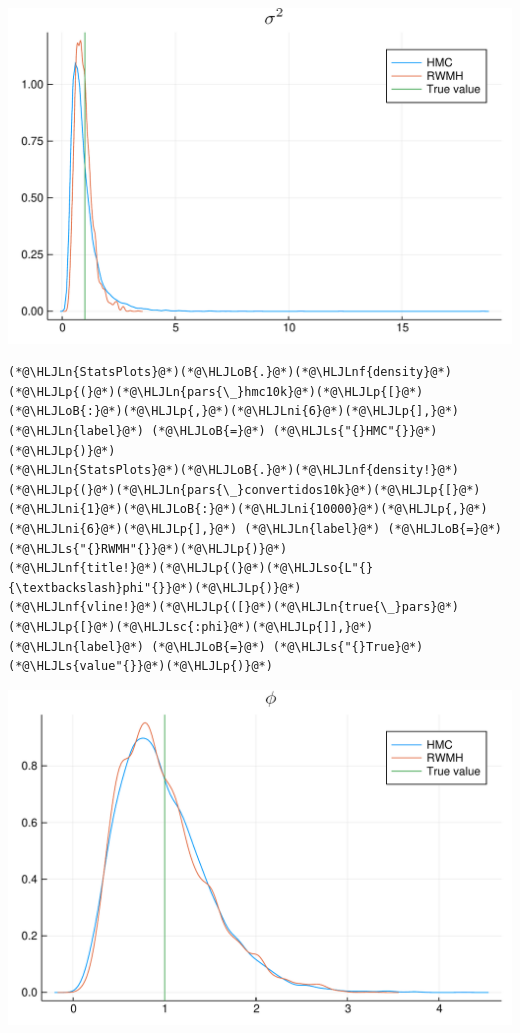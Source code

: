 \documentclass[12pt,a4paper]{article}
\newcommand{\HLJLn}[1]{#1}
\newcommand{\HLJLnf}[1]{\textcolor[RGB]{66,102,213}{#1}}
\newcommand{\HLJLs}[1]{\textcolor[RGB]{201,61,57}{#1}}
\newcommand{\HLJLsc}[1]{\textcolor[RGB]{201,61,57}{#1}}
\newcommand{\HLJLso}[1]{\textcolor[RGB]{201,61,57}{#1}}
\newcommand{\HLJLni}[1]{\textcolor[RGB]{59,151,46}{#1}}
\newcommand{\HLJLoB}[1]{\textcolor[RGB]{102,102,102}{\textbf{#1}}}
\newcommand{\HLJLp}[1]{#1}
\begin{document}
\includegraphics[width=\linewidth]{figures/dsge_and_julia_57_1.pdf}

\begin{lstlisting}
(*@\HLJLn{StatsPlots}@*)(*@\HLJLoB{.}@*)(*@\HLJLnf{density}@*)(*@\HLJLp{(}@*)(*@\HLJLn{pars{\_}hmc10k}@*)(*@\HLJLp{[}@*)(*@\HLJLoB{:}@*)(*@\HLJLp{,}@*)(*@\HLJLni{6}@*)(*@\HLJLp{],}@*) (*@\HLJLn{label}@*) (*@\HLJLoB{=}@*) (*@\HLJLs{"{}HMC"{}}@*)(*@\HLJLp{)}@*)
(*@\HLJLn{StatsPlots}@*)(*@\HLJLoB{.}@*)(*@\HLJLnf{density!}@*)(*@\HLJLp{(}@*)(*@\HLJLn{pars{\_}convertidos10k}@*)(*@\HLJLp{[}@*)(*@\HLJLni{1}@*)(*@\HLJLoB{:}@*)(*@\HLJLni{10000}@*)(*@\HLJLp{,}@*)(*@\HLJLni{6}@*)(*@\HLJLp{],}@*) (*@\HLJLn{label}@*) (*@\HLJLoB{=}@*) (*@\HLJLs{"{}RWMH"{}}@*)(*@\HLJLp{)}@*)
(*@\HLJLnf{title!}@*)(*@\HLJLp{(}@*)(*@\HLJLso{L"{}{\textbackslash}phi"{}}@*)(*@\HLJLp{)}@*)
(*@\HLJLnf{vline!}@*)(*@\HLJLp{([}@*)(*@\HLJLn{true{\_}pars}@*)(*@\HLJLp{[}@*)(*@\HLJLsc{:phi}@*)(*@\HLJLp{]],}@*) (*@\HLJLn{label}@*) (*@\HLJLoB{=}@*) (*@\HLJLs{"{}True}@*) (*@\HLJLs{value"{}}@*)(*@\HLJLp{)}@*)
\end{lstlisting}

\includegraphics[width=\linewidth]{figures/dsge_and_julia_58_1.pdf}
\end{document}
